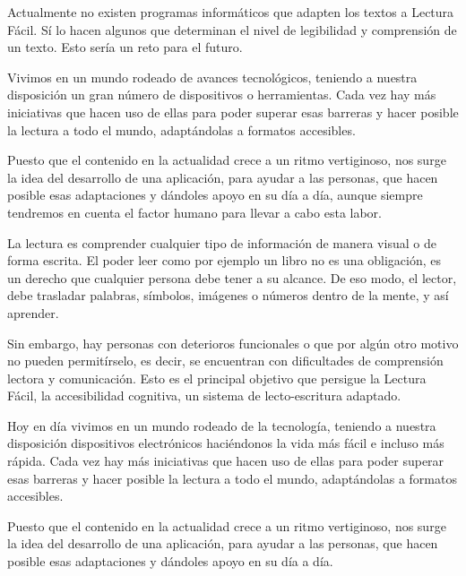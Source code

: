 \setlength{\parskip}{10pt}

Actualmente no existen programas informáticos que adapten los textos a Lectura Fácil. Sí lo hacen algunos que determinan el nivel de legibilidad y comprensión de un texto. Esto sería un reto para el futuro.  

\setlength{\parskip}{10pt}
Vivimos en un mundo rodeado de avances tecnológicos, teniendo a nuestra disposición un gran número de dispositivos o herramientas. Cada vez hay más iniciativas que hacen uso de ellas para poder superar esas barreras y hacer posible la lectura a todo el mundo, adaptándolas a formatos accesibles. 

 \setlength{\parskip}{10pt}
 
Puesto que el contenido en la actualidad crece a un ritmo vertiginoso, nos surge la idea del desarrollo de una aplicación, para ayudar a las personas, que hacen posible esas adaptaciones y dándoles apoyo en su día a día, aunque siempre tendremos en cuenta el factor humano para llevar a cabo esta labor.

La lectura es comprender cualquier tipo de información de manera visual o de forma escrita. El poder leer como por ejemplo un libro no es una obligación, es un derecho que cualquier persona debe tener a su alcance. De eso modo, el lector, debe trasladar palabras, símbolos, imágenes o números dentro de la mente, y así aprender.

 \setlength{\parskip}{10pt}

 Sin embargo, hay personas con deterioros funcionales o que por algún otro motivo no pueden permitírselo, es decir, se encuentran con dificultades de comprensión lectora y comunicación. Esto es el principal objetivo que persigue la Lectura Fácil, la accesibilidad cognitiva, un sistema de lecto-escritura adaptado.
 
 \setlength{\parskip}{10pt}
 
Hoy en día vivimos en un mundo rodeado de la tecnología, teniendo a nuestra disposición dispositivos electrónicos haciéndonos la vida más fácil e incluso más rápida. Cada vez hay más iniciativas que hacen uso de ellas para poder superar esas barreras y hacer posible la lectura a todo el mundo, adaptándolas a formatos accesibles. 

 \setlength{\parskip}{10pt}
 
Puesto que el contenido en la actualidad crece a un ritmo vertiginoso, nos surge la idea del desarrollo de una aplicación, para ayudar a las personas, que hacen posible esas adaptaciones y dándoles apoyo en su día a día.



